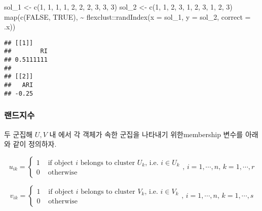 \documentclass[
]{book}
\newenvironment{Shaded}{\begin{snugshade}}{\end{snugshade}}
\newcommand{\AttributeTok}[1]{\textcolor[rgb]{0.77,0.63,0.00}{#1}}
\newcommand{\ConstantTok}[1]{\textcolor[rgb]{0.00,0.00,0.00}{#1}}
\newcommand{\DecValTok}[1]{\textcolor[rgb]{0.00,0.00,0.81}{#1}}
\newcommand{\FunctionTok}[1]{\textcolor[rgb]{0.00,0.00,0.00}{#1}}
\newcommand{\NormalTok}[1]{#1}
\newcommand{\OtherTok}[1]{\textcolor[rgb]{0.56,0.35,0.01}{#1}}
\newcommand{\SpecialCharTok}[1]{\textcolor[rgb]{0.00,0.00,0.00}{#1}}
\begin{document}
\begin{Shaded}
\begin{Highlighting}[]
\NormalTok{sol\_1 }\OtherTok{\textless{}{-}} \FunctionTok{c}\NormalTok{(}\DecValTok{1}\NormalTok{, }\DecValTok{1}\NormalTok{, }\DecValTok{1}\NormalTok{, }\DecValTok{1}\NormalTok{, }\DecValTok{2}\NormalTok{, }\DecValTok{2}\NormalTok{, }\DecValTok{2}\NormalTok{, }\DecValTok{3}\NormalTok{, }\DecValTok{3}\NormalTok{, }\DecValTok{3}\NormalTok{)}
\NormalTok{sol\_2 }\OtherTok{\textless{}{-}} \FunctionTok{c}\NormalTok{(}\DecValTok{1}\NormalTok{, }\DecValTok{1}\NormalTok{, }\DecValTok{2}\NormalTok{, }\DecValTok{3}\NormalTok{, }\DecValTok{1}\NormalTok{, }\DecValTok{2}\NormalTok{, }\DecValTok{3}\NormalTok{, }\DecValTok{1}\NormalTok{, }\DecValTok{2}\NormalTok{, }\DecValTok{3}\NormalTok{)}
\FunctionTok{map}\NormalTok{(}\FunctionTok{c}\NormalTok{(}\ConstantTok{FALSE}\NormalTok{, }\ConstantTok{TRUE}\NormalTok{), }
    \SpecialCharTok{\textasciitilde{}}\NormalTok{ flexclust}\SpecialCharTok{::}\FunctionTok{randIndex}\NormalTok{(}\AttributeTok{x =}\NormalTok{ sol\_1, }\AttributeTok{y =}\NormalTok{ sol\_2, }\AttributeTok{correct =}\NormalTok{ .x))}
\end{Highlighting}
\end{Shaded}

\begin{verbatim}
## [[1]]
##        RI 
## 0.5111111 
## 
## [[2]]
##   ARI 
## -0.25
\end{verbatim}

\hypertarget{cluster-external-rand-index}{%
\subsubsection{랜드지수}\label{cluster-external-rand-index}}

두 군집해 \(U, V\) 내 에서 각 객체가 속한 군집을 나타내기 위한membership 변수를 아래와 같이 정의하자.

\begin{equation*}
u_{ik} = \begin{cases}
1 & \text{ if object $i$ belongs to cluster $U_k$, i.e. } i \in U_k \\
0 & \text{ otherwise}
\end{cases}, \, i = 1, \cdots, n, \, k = 1, \cdots, r
\end{equation*}

\begin{equation*}
v_{ik} = \begin{cases}
1 & \text{ if object $i$ belongs to cluster $V_k$, i.e. } i \in V_k \\
0 & \text{ otherwise}
\end{cases}, \, i = 1, \cdots, n, \, k = 1, \cdots, s
\end{equation*}
\end{document}
